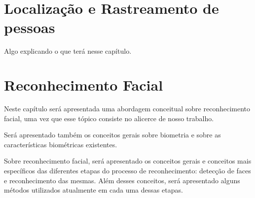 
\chapter{Localização e Rastreamento de pessoas}

	Algo explicando o que terá nesse capítulo.

	
	

\chapter{Reconhecimento Facial}

	Neste capítulo será apresentada uma abordagem conceitual sobre reconhecimento facial, uma vez que esse tópico consiste no alicerce de nosso trabalho. 

	Será apresentado também os conceitos gerais sobre biometria e sobre as características biométricas existentes.

	Sobre reconhecimento facial, será apresentado os conceitos gerais e conceitos mais específicos das diferentes etapas do processo de reconhecimento: detecção de faces e reconhecimento das mesmas. Além desses conceitos, será apresentado alguns métodos utilizados atualmente em cada uma dessas etapas.


	
	































